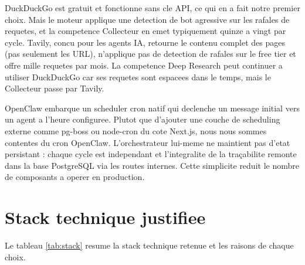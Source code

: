 \documentclass[12pt,a4paper,openany]{report}
\begin{document}
\begin{decisionBox}[title={Decision 4 : Tavily comme provider primaire de recherche web, DuckDuckGo en fallback}]
DuckDuckGo est gratuit et fonctionne sans cle API, ce qui en a fait notre premier choix. Mais le moteur applique une detection de bot agressive sur les rafales de requetes, et la competence Collecteur en emet typiquement quinze a vingt par cycle. Tavily, concu pour les agents IA, retourne le contenu complet des pages (pas seulement les URL), n'applique pas de detection de rafales sur le free tier et offre mille requetes par mois. La competence Deep Research peut continuer a utiliser DuckDuckGo car ses requetes sont espacees dans le temps, mais le Collecteur passe par Tavily.
\end{decisionBox}

\begin{decisionBox}[title=Decision 5 : cron OpenClaw natif et orchestrateur sans persistance propre]
OpenClaw embarque un scheduler cron natif qui declenche un message initial vers un agent a l'heure configuree. Plutot que d'ajouter une couche de scheduling externe comme pg-boss ou node-cron du cote Next.js, nous nous sommes contentes du cron OpenClaw. L'orchestrateur lui-meme ne maintient pas d'etat persistant : chaque cycle est independant et l'integralite de la traçabilite remonte dans la base PostgreSQL via les routes internes. Cette simplicite reduit le nombre de composants a operer en production.
\end{decisionBox}

\section{Stack technique justifiee}
\label{sec:stack-technique}

Le tableau \ref{tab:stack} resume la stack technique retenue et les raisons de chaque choix.
\end{document}
